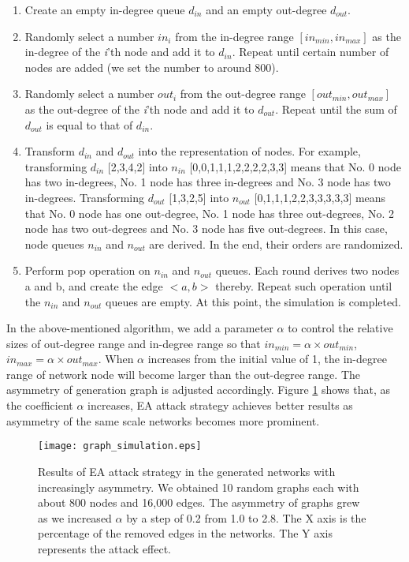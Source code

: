 \documentclass[aps,prl,twocolumn,showpacs,superscriptaddress,groupedaddress]{revtex4}  %
\begin{document}
\begin{enumerate}
  \item Create an empty in-degree queue $d_{in}$ and an empty out-degree $d_{out}$.
  \item Randomly select a number $in_{i}$  from the in-degree range $[in_{min}, in_{max}]$ as the in-degree of the \emph{i}'th node and add it to $d_{in}$. Repeat until certain number of nodes are added (we set the number to around 800).
  \item Randomly select a number $out_{i}$ from the out-degree range $[out_{min}, out_{max}]$ as the out-degree of the \emph{i}'th node and add it to $d_{out}$. Repeat until the sum of $d_{out}$ is equal to that of $d_{in}$.
  \item Transform $d_{in}$ and $d_{out}$ into the representation of nodes. For example, transforming $d_{in}$   [2,3,4,2] into $n_{in}$ [0,0,1,1,1,2,2,2,2,3,3] means that No. 0 node has two in-degrees, No. 1 node has three in-degrees and No. 3 node has two in-degrees. Transforming $d_{out}$ [1,3,2,5] into $n_{out}$ [0,1,1,1,2,2,3,3,3,3,3] means that No. 0 node has one out-degree, No. 1 node has three out-degrees, No. 2 node has two out-degrees and No. 3 node has five out-degrees. In this case, node queues $n_{in}$ and $n_{out}$ are derived. In the end, their orders are randomized.
  \item Perform pop operation on $n_{in}$ and $n_{out}$ queues. Each round derives two nodes a and b, and create the edge $<a, b>$ thereby. Repeat such operation until the $n_{in}$ and $n_{out}$ queues are empty. At this point, the simulation is completed.
\end{enumerate}

In the above-mentioned algorithm, we add a parameter $\alpha$ to control the relative sizes of out-degree range and in-degree range so that $in_{min}=\alpha \times out_{min}$, $in_{max}=\alpha \times out_{max}$. When $\alpha$ increases from the initial value of 1, the in-degree range of network node will become larger than the out-degree range. The asymmetry of generation graph is adjusted accordingly. Figure \ref{fig:6} shows that, as the coefficient $\alpha$ increases, EA attack strategy achieves better results as asymmetry of the same scale networks becomes more prominent.


\begin{figure}[htbp]
\begin{center}
\texttt{[image: graph\_simulation.eps]}
\caption{Results of EA attack strategy in the generated networks with increasingly asymmetry. We obtained 10 random graphs each with about 800 nodes and 16,000 edges. The asymmetry of graphs grew as we increased $\alpha$ by a step of 0.2 from 1.0 to 2.8. The X axis is the percentage of the removed edges in the networks. The Y axis represents the attack effect.} \label{fig:6}
\end{center}
\end{figure}
\end{document}
